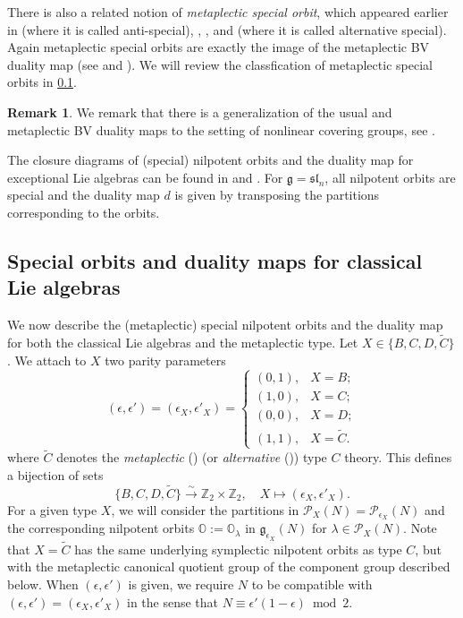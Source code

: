 \documentclass[11pt, a4paper]{amsart}
\newcommand{\g}{\mathfrak{g}}
\newcommand{\orb}{\mathbb{O}}
\newcommand{\Z}{\mathbb{Z}}
\newcommand{\cP}{\mathcal{P}}
\newcommand{\mC}{\widetilde{C}}
\theoremstyle{definition}
\newtheorem{Rem}[Thm]{Remark}
\numberwithin{equation}{section}
\begin{document}
There is also a related notion of {\it metaplectic special orbit}, which appeared earlier in \cite{Moeglin:p-adic} (where it is called anti-special), \cite{JiangLiuSavin}, \cite{BMSZ:metaplecticBV}, and \cite{JLS:Duality} (where it is called alternative special). Again metaplectic special orbits are exactly the image of the metaplectic BV duality map (see \cite{BMSZ:metaplecticBV} and \cite{JLS:Duality}). We will review the classfication of metaplectic special orbits in \cref{subsec:special_duality_classical}.


\begin{Rem}
    We remark that there is a generalization of the usual and metaplectic BV duality maps to the setting of nonlinear covering groups, see \cite{GLLS:covering_BV}. 
\end{Rem}


The closure diagrams of (special) nilpotent orbits and the duality map for exceptional Lie algebras can be found in \cite{Spaltenstein} and \cite{JLS:Duality}. 
For $\g=\mathfrak{sl}_n$, all nilpotent orbits are special and the duality map $d$ is given by transposing the partitions corresponding to the orbits.

\subsection{Special orbits and duality maps for classical Lie algebras} \label{subsec:special_duality_classical}

We now describe the (metaplectic) special nilpotent orbits and the duality map for both the classical Lie algebras and the metaplectic type. Let $X \in \{B, C, D, \mC\}$. We attach to \(X\) two parity parameters
\[
(\epsilon,\epsilon') = (\epsilon_X,\epsilon'_X) =
\begin{cases}
(0,1), & X=B;\\
(1,0), & X=C;\\
(0,0), & X=D;\\
(1,1), & X=\mC.
\end{cases}
\]
where \(\mC\) denotes the {\it metaplectic} (\cite{BMSZ:metaplecticBV}) (or {\it alternative} (\cite{JLS:Duality})) type \(C\) theory. This defines a bijection of sets
\begin{equation} \label{eq:pairs_types}
	\{B,C,D,\mC\} \xrightarrow{\sim} \Z_2 \times \Z_2, \quad X \mapsto (\epsilon_X,\epsilon'_X). 
\end{equation}
For a given type $X$, we will consider the partitions in $\cP_X(N) = \cP_{\epsilon_X}(N)$ and the corresponding nilpotent orbits $\orb := \orb_{\lambda}$ in $\g_{\epsilon_X}(N)$ for $\lambda \in \cP_X(N)$.
Note that \(X=\mC\) has the same underlying symplectic nilpotent orbits as type \(C\), but with the metaplectic canonical quotient group of the component group described below. When $(\epsilon,\epsilon')$ is given, we require $N$ to be compatible with $(\epsilon,\epsilon')=(\epsilon_X,\epsilon'_X)$ in the sense that $N \equiv \epsilon'(1-\epsilon) \bmod{2}$.
\end{document}
